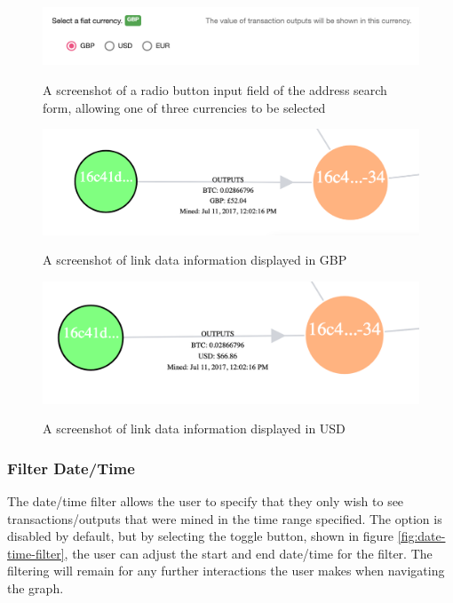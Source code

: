 \begin{figure}[h!]
  \centering
  \includegraphics[width = 15cm]{./figures/ui-screenshots/fiat-currency-selection}\\[0.5cm] 
  \caption{A screenshot of a radio button input field of the address search form, allowing one of three currencies to be selected}
  \label{fig:select-fiat-currencies}
\end{figure}
\begin{figure}[h!]
  \centering
  \includegraphics[width = 15cm]{./figures/ui-screenshots/fiat-currency-link-gbp}\\[0.5cm] 
  \caption{A screenshot of link data information displayed in GBP}
  \label{fig:select-fiat-currencies-gbp}
\end{figure}
\begin{figure}[h!]
  \centering
  \includegraphics[width = 15cm]{./figures/ui-screenshots/fiat-currency-link-usd}\\[0.5cm] 
  \caption{A screenshot of link data information displayed in USD}
  \label{fig:select-fiat-currencies-usd}
\end{figure}

\subsubsection{Filter Date/Time}
The date/time filter allows the user to specify that they only wish to see transactions/outputs that were mined in the time range specified. The option is disabled by default, but by selecting the toggle button, shown in figure \ref{fig:date-time-filter}, the user can adjust the start and end date/time for the filter. The filtering will remain for any further interactions the user makes when navigating the graph. 

